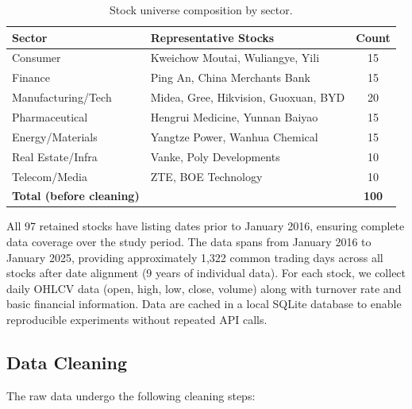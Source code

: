 \documentclass[12pt, a4paper]{article}
\begin{document}
\begin{table}[htbp]
\centering
\caption{Stock universe composition by sector.}
\label{tab:stock_universe}
\begin{tabular}{llc}
\toprule
\textbf{Sector} & \textbf{Representative Stocks} & \textbf{Count} \\
\midrule
Consumer          & Kweichow Moutai, Wuliangye, Yili    & 15 \\
Finance           & Ping An, China Merchants Bank        & 15 \\
Manufacturing/Tech & Midea, Gree, Hikvision, Guoxuan, BYD  & 20 \\
Pharmaceutical    & Hengrui Medicine, Yunnan Baiyao      & 15 \\
Energy/Materials  & Yangtze Power, Wanhua Chemical       & 15 \\
Real Estate/Infra & Vanke, Poly Developments             & 10 \\
Telecom/Media     & ZTE, BOE Technology                  & 10 \\
\midrule
\textbf{Total (before cleaning)} &                      & \textbf{100} \\
\bottomrule
\end{tabular}
\end{table}

All 97 retained stocks have listing dates prior to January 2016, ensuring complete data coverage over the study period. The data spans from January 2016 to January 2025, providing approximately 1,322 common trading days across all stocks after date alignment (9 years of individual data). For each stock, we collect daily OHLCV data (open, high, low, close, volume) along with turnover rate and basic financial information. Data are cached in a local SQLite database to enable reproducible experiments without repeated API calls.

\subsection{Data Cleaning} \label{sec:data_cleaning}

The raw data undergo the following cleaning steps:
\end{document}
